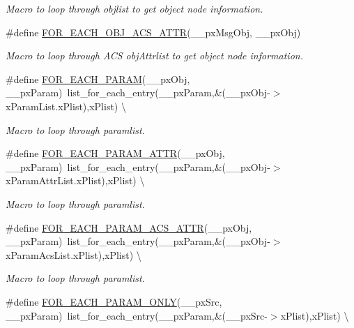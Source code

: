 \begin{DoxyCompactItemize}
\begin{DoxyCompactList}\small\item\em Macro to loop through objlist to get object node information. \end{DoxyCompactList}\item 
\#define \hyperlink{group__LIBHELP_ga30619bca4a323f6a42cf6ffb33ba5e23}{F\-O\-R\-\_\-\-E\-A\-C\-H\-\_\-\-O\-B\-J\-\_\-\-A\-C\-S\-\_\-\-A\-T\-T\-R}(\-\_\-\-\_\-px\-Msg\-Obj, \-\_\-\-\_\-px\-Obj)
\begin{DoxyCompactList}\small\item\em Macro to loop through A\-C\-S obj\-Attrlist to get object node information. \end{DoxyCompactList}\item 
\#define \hyperlink{group__LIBHELP_gab25405551b9dc0374fe8ad9b5b5dcdea}{F\-O\-R\-\_\-\-E\-A\-C\-H\-\_\-\-P\-A\-R\-A\-M}(\-\_\-\-\_\-px\-Obj, \-\_\-\-\_\-px\-Param)~list\-\_\-for\-\_\-each\-\_\-entry(\-\_\-\-\_\-px\-Param,\&(\-\_\-\-\_\-px\-Obj-\/$>$x\-Param\-List.\-x\-Plist),x\-Plist) \textbackslash{}
\begin{DoxyCompactList}\small\item\em Macro to loop through paramlist. \end{DoxyCompactList}\item 
\#define \hyperlink{group__LIBHELP_gaac754be7ba93a531e7f7cc29dd51e5af}{F\-O\-R\-\_\-\-E\-A\-C\-H\-\_\-\-P\-A\-R\-A\-M\-\_\-\-A\-T\-T\-R}(\-\_\-\-\_\-px\-Obj, \-\_\-\-\_\-px\-Param)~list\-\_\-for\-\_\-each\-\_\-entry(\-\_\-\-\_\-px\-Param,\&(\-\_\-\-\_\-px\-Obj-\/$>$x\-Param\-Attr\-List.\-x\-Plist),x\-Plist) \textbackslash{}
\begin{DoxyCompactList}\small\item\em Macro to loop through paramlist. \end{DoxyCompactList}\item 
\#define \hyperlink{group__LIBHELP_ga9bdb84fed22878f1e753171b4e32fd40}{F\-O\-R\-\_\-\-E\-A\-C\-H\-\_\-\-P\-A\-R\-A\-M\-\_\-\-A\-C\-S\-\_\-\-A\-T\-T\-R}(\-\_\-\-\_\-px\-Obj, \-\_\-\-\_\-px\-Param)~list\-\_\-for\-\_\-each\-\_\-entry(\-\_\-\-\_\-px\-Param,\&(\-\_\-\-\_\-px\-Obj-\/$>$x\-Param\-Acs\-List.\-x\-Plist),x\-Plist) \textbackslash{}
\begin{DoxyCompactList}\small\item\em Macro to loop through paramlist. \end{DoxyCompactList}\item 
\#define \hyperlink{group__LIBHELP_ga48d32c5e5c8acfcb89ea998ed1e4a92a}{F\-O\-R\-\_\-\-E\-A\-C\-H\-\_\-\-P\-A\-R\-A\-M\-\_\-\-O\-N\-L\-Y}(\-\_\-\-\_\-px\-Src, \-\_\-\-\_\-px\-Param)~list\-\_\-for\-\_\-each\-\_\-entry(\-\_\-\-\_\-px\-Param,\&(\-\_\-\-\_\-px\-Src-\/$>$x\-Plist),x\-Plist) \textbackslash{}

\end{DoxyCompactItemize}
